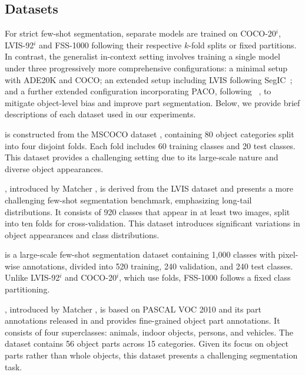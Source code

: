 \subsection{Datasets}
For strict few-shot segmentation, separate models are trained on COCO-20$^i$, LVIS-92$^i$ and FSS-1000 following their respective $k$-fold splits or fixed partitions. In contrast, the generalist in-context setting involves training a single model under three progressively more comprehensive configurations: a minimal setup with ADE20K and COCO; an extended setup including LVIS following SegIC~\cite{meng2024segic}; and a further extended configuration incorporating PACO, following ~\cite{wang2023seggpt, liu2024simple}, to mitigate object-level bias and improve part segmentation.
Below, we provide brief descriptions of each dataset used in our experiments.

 \cite{nguyen2019feature} is constructed from the MSCOCO dataset \cite{lin2014microsoft}, containing 80 object categories split into four disjoint folds. Each fold includes 60 training classes and 20 test classes. This dataset provides a challenging setting due to its large-scale nature and diverse object appearances.

, introduced by Matcher \cite{liu2023matcher}, is derived from the LVIS dataset \cite{gupta2019lvis} and presents a more challenging few-shot segmentation benchmark, emphasizing long-tail distributions.  It consists of 920 classes that appear in at least two images, split into ten folds for cross-validation. This dataset introduces significant variations in object appearances and class distributions.

 \cite{gao2022mutually} is a large-scale few-shot segmentation dataset containing 1,000 classes with pixel-wise annotations,  divided into 520 training, 240 validation, and 240 test classes. Unlike LVIS-92$^i$ and COCO-20$^i$, which use folds, FSS-1000 follows a fixed class partitioning.


, introduced by Matcher \cite{liu2023matcher}, is based on PASCAL VOC 2010 \cite{everingham2010pascal} and its part annotations released in \cite{chen2014detect} and provides fine-grained object part annotations. It consists of four superclasses: animals, indoor objects, persons, and vehicles. The dataset contains 56 object parts across 15 categories. Given its focus on object parts rather than whole objects, this dataset presents a challenging segmentation task.

